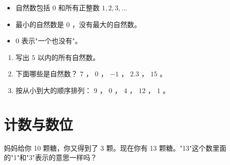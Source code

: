 \begin{keytakeaway}


\begin{itemize}
  \item 自然数包括 $0$ 和所有正整数 $1, 2, 3, \ldots$
  \item 最小的自然数是 $0$ ，没有最大的自然数。
  \item $0$ 表示"一个也没有"。
\end{itemize}


\end{keytakeaway}

\begin{practice}


\begin{enumerate}
  \item 写出 $5$ 以内的所有自然数。
  \item 下面哪些是自然数？ $7$ ， $0$ ， $-1$ ， $2.3$ ， $15$ 。
  \item 按从小到大的顺序排列： $9$ ， $0$ ， $4$ ， $12$ ， $1$ 。
\end{enumerate}


\end{practice}

\section*{计数与数位}


\begin{explore}


妈妈给你 10 颗糖，你又得到了 3 颗。现在你有 13 颗糖。"13"这个数里面的"1"和"3"表示的意思一样吗？

\end{explore}

